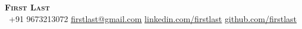 \begin{center}
    \textbf{\Huge \scshape First Last} \\ \vspace{1pt}
     \ \small +91 9673213072 \quad
    \href{mailto:firstlast@gmail.com}{ \underline{firstlast@gmail.com}} \quad
    \href{https://www.linkedin.com/in/}{ \underline{linkedin.com/firstlast}} \quad
    \href{https://github.com/}{ \underline{github.com/firstlast}}
\end{center}